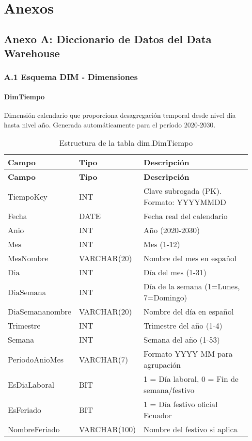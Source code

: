 
\chapter{Anexos}
\section{Anexo A: Diccionario de Datos del Data Warehouse}

\subsection{A.1 Esquema DIM - Dimensiones}

\subsubsection{DimTiempo}

Dimensión calendario que proporciona desagregación temporal desde nivel día hasta nivel año. Generada automáticamente para el período 2020-2030.

\begin{longtable}{|p{4cm}|p{3cm}|p{6cm}|}
\caption{Estructura de la tabla dim.DimTiempo} \\
\hline
\textbf{Campo} & \textbf{Tipo} & \textbf{Descripción} \\
\hline
\endfirsthead
\hline
\textbf{Campo} & \textbf{Tipo} & \textbf{Descripción} \\
\hline
\endhead
TiempoKey & INT & Clave subrogada (PK). Formato: YYYYMMDD \\
\hline
Fecha & DATE & Fecha real del calendario \\
\hline
Anio & INT & Año (2020-2030) \\
\hline
Mes & INT & Mes (1-12) \\
\hline
MesNombre & VARCHAR(20) & Nombre del mes en español \\
\hline
Dia & INT & Día del mes (1-31) \\
\hline
DiaSemana & INT & Día de la semana (1=Lunes, 7=Domingo) \\
\hline
DiaSemananombre & VARCHAR(20) & Nombre del día en español \\
\hline
Trimestre & INT & Trimestre del año (1-4) \\
\hline
Semana & INT & Semana del año (1-53) \\
\hline
PeriodoAnioMes & VARCHAR(7) & Formato YYYY-MM para agrupación \\
\hline
EsDiaLaboral & BIT & 1 = Día laboral, 0 = Fin de semana/festivo \\
\hline
EsFeriado & BIT & 1 = Día festivo oficial Ecuador \\
\hline
NombreFeriado & VARCHAR(100) & Nombre del festivo si aplica \\
\hline
\end{longtable}

